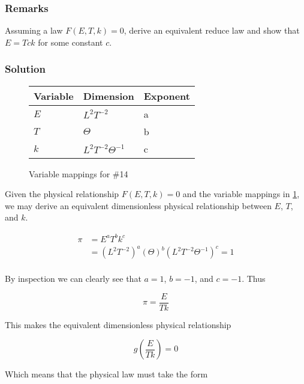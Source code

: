 \documentclass[12pt]{article}
\begin{document}
  \subsubsection*{Remarks}
  Assuming a law $F(E,T,k)=0$, derive an equivalent reduce law and show that
  $E=Tck$ for some constant $c$.

  \subsubsection*{Solution}

  \begin{figure}
    \centering
    \begin{tabularx}{0.5\textwidth}{XXX}
      Variable & Dimension & Exponent \\ \midrule
      $E$ & $L^2T^{-2}$ & a \\
      $T$ & $\Theta$ & b \\
      $k$ & $L^2T^{-2}\Theta^{-1}$ & c \\
    \end{tabularx}
    \caption{Variable mappings for \#14}
\label{fig:14-var-mappings}
  \end{figure}

  Given the physical relationship $F(E,T,k)=0$ and the variable mappings in
  \cref{fig:14-var-mappings}, we may derive an equivalent dimensionless physical
  relationship between $E$, $T$, and $k$.

  \begin{equation}
    \begin{aligned}
      \pi &= E^a T^b k^c \\
      &= {(L^2T^{-2})}^a {(\Theta)}^{b} {(L^2T^{-2}\Theta^{-1})}^c = 1\\
    \end{aligned}
  \end{equation}

  By inspection we can clearly see that $a=1$, $b=-1$, and $c=-1$. Thus

  \begin{equation}
    \pi = \frac{E}{Tk}
  \end{equation}

  This makes the equivalent dimensionless physical relationship

  \begin{equation}
    g\left(\frac{E}{Tk}\right) = 0
  \end{equation}

  Which means that the physical law must take the form
\end{document}
